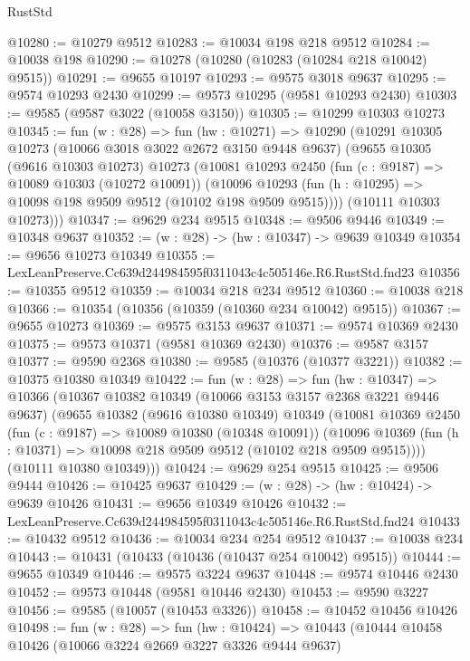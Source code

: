 \begin{lexlean}{RustStd}
\begin{coremodule}
@10280 := @10279 @9512
@10283 := @10034 @198 @218 @9512
@10284 := @10038 @198
@10290 := @10278 (@10280 (@10283 (@10284 @218 @10042) @9515))
@10291 := @9655 @10197
@10293 := @9575 @3018 @9637
@10295 := @9574 @10293 @2430
@10299 := @9573 @10295 (@9581 @10293 @2430)
@10303 := @9585 (@9587 @3022 (@10058 @3150))
@10305 := @10299 @10303 @10273
@10345 := fun (w : @28) =>
  fun (hw : @10271) =>
  @10290
    (@10291
      @10305
      @10273
      (@10066 @3018 @3022 @2672 @3150 @9448 @9637)
      (@9655
        @10305
        (@9616 @10303 @10273)
        @10273
        (@10081
          @10293
          @2450
          (fun (c : @9187) => @10089 @10303 (@10272 @10091))
          (@10096 @10293 (fun (h : @10295) => @10098 @198 @9509 @9512 (@10102 @198 @9509 @9515))))
        (@10111 @10303 @10273)))
@10347 := @9629 @234 @9515
@10348 := @9506 @9446
@10349 := @10348 @9637
@10352 := (w : @28) -> (hw : @10347) -> @9639 @10349
@10354 := @9656 @10273 @10349
@10355 := LexLeanPreserve.Cc639d244984595f0311043c4c505146e.R6.RustStd.fnd23
@10356 := @10355 @9512
@10359 := @10034 @218 @234 @9512
@10360 := @10038 @218
@10366 := @10354 (@10356 (@10359 (@10360 @234 @10042) @9515))
@10367 := @9655 @10273
@10369 := @9575 @3153 @9637
@10371 := @9574 @10369 @2430
@10375 := @9573 @10371 (@9581 @10369 @2430)
@10376 := @9587 @3157
@10377 := @9590 @2368
@10380 := @9585 (@10376 (@10377 @3221))
@10382 := @10375 @10380 @10349
@10422 := fun (w : @28) =>
  fun (hw : @10347) =>
  @10366
    (@10367
      @10382
      @10349
      (@10066 @3153 @3157 @2368 @3221 @9446 @9637)
      (@9655
        @10382
        (@9616 @10380 @10349)
        @10349
        (@10081
          @10369
          @2450
          (fun (c : @9187) => @10089 @10380 (@10348 @10091))
          (@10096 @10369 (fun (h : @10371) => @10098 @218 @9509 @9512 (@10102 @218 @9509 @9515))))
        (@10111 @10380 @10349)))
@10424 := @9629 @254 @9515
@10425 := @9506 @9444
@10426 := @10425 @9637
@10429 := (w : @28) -> (hw : @10424) -> @9639 @10426
@10431 := @9656 @10349 @10426
@10432 := LexLeanPreserve.Cc639d244984595f0311043c4c505146e.R6.RustStd.fnd24
@10433 := @10432 @9512
@10436 := @10034 @234 @254 @9512
@10437 := @10038 @234
@10443 := @10431 (@10433 (@10436 (@10437 @254 @10042) @9515))
@10444 := @9655 @10349
@10446 := @9575 @3224 @9637
@10448 := @9574 @10446 @2430
@10452 := @9573 @10448 (@9581 @10446 @2430)
@10453 := @9590 @3227
@10456 := @9585 (@10057 (@10453 @3326))
@10458 := @10452 @10456 @10426
@10498 := fun (w : @28) =>
  fun (hw : @10424) =>
  @10443
    (@10444
      @10458
      @10426
      (@10066 @3224 @2669 @3227 @3326 @9444 @9637)

\end{coremodule}
\end{lexlean}
